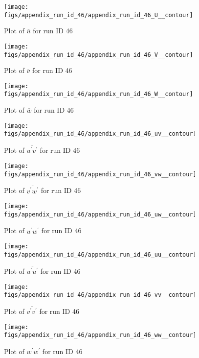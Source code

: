 \begin{figure}[H]
\centering
\texttt{[image: figs/appendix\_run\_id\_46/appendix\_run\_id\_46\_U\_\_contour]}
\caption{Plot of $\overline{u}$ for run ID 46}
\label{fig:appendix_run_id_46_U__contour}
\end{figure}


\begin{figure}[H]
\centering
\texttt{[image: figs/appendix\_run\_id\_46/appendix\_run\_id\_46\_V\_\_contour]}
\caption{Plot of $\overline{v}$ for run ID 46}
\label{fig:appendix_run_id_46_V__contour}
\end{figure}


\begin{figure}[H]
\centering
\texttt{[image: figs/appendix\_run\_id\_46/appendix\_run\_id\_46\_W\_\_contour]}
\caption{Plot of $\overline{w}$ for run ID 46}
\label{fig:appendix_run_id_46_W__contour}
\end{figure}


\begin{figure}[H]
\centering
\texttt{[image: figs/appendix\_run\_id\_46/appendix\_run\_id\_46\_uv\_\_contour]}
\caption{Plot of $\overline{u^\prime v^\prime}$ for run ID 46}
\label{fig:appendix_run_id_46_uv__contour}
\end{figure}


\begin{figure}[H]
\centering
\texttt{[image: figs/appendix\_run\_id\_46/appendix\_run\_id\_46\_vw\_\_contour]}
\caption{Plot of $\overline{v^\prime w^\prime}$ for run ID 46}
\label{fig:appendix_run_id_46_vw__contour}
\end{figure}


\begin{figure}[H]
\centering
\texttt{[image: figs/appendix\_run\_id\_46/appendix\_run\_id\_46\_uw\_\_contour]}
\caption{Plot of $\overline{u^\prime w^\prime}$ for run ID 46}
\label{fig:appendix_run_id_46_uw__contour}
\end{figure}


\begin{figure}[H]
\centering
\texttt{[image: figs/appendix\_run\_id\_46/appendix\_run\_id\_46\_uu\_\_contour]}
\caption{Plot of $\overline{u^\prime u^\prime}$ for run ID 46}
\label{fig:appendix_run_id_46_uu__contour}
\end{figure}


\begin{figure}[H]
\centering
\texttt{[image: figs/appendix\_run\_id\_46/appendix\_run\_id\_46\_vv\_\_contour]}
\caption{Plot of $\overline{v^\prime v^\prime}$ for run ID 46}
\label{fig:appendix_run_id_46_vv__contour}
\end{figure}


\begin{figure}[H]
\centering
\texttt{[image: figs/appendix\_run\_id\_46/appendix\_run\_id\_46\_ww\_\_contour]}
\caption{Plot of $\overline{w^\prime w^\prime}$ for run ID 46}
\label{fig:appendix_run_id_46_ww__contour}
\end{figure}


